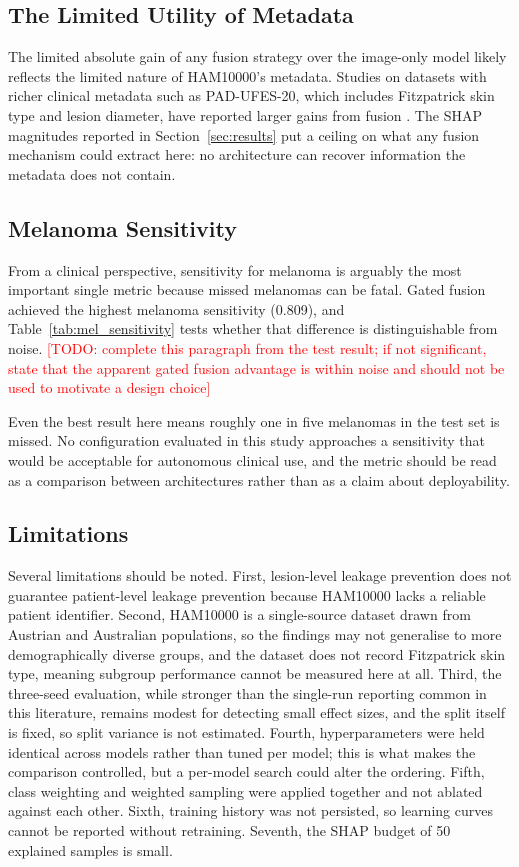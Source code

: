 \documentclass[conference]{IEEEtran}
\newcommand{\TODO}[1]{\textcolor{red}{[TODO: #1]}}
\begin{document}
\subsection{The Limited Utility of Metadata}

The limited absolute gain of any fusion strategy over the image-only model likely reflects the limited nature of HAM10000's metadata. Studies on datasets with richer clinical metadata such as PAD-UFES-20, which includes Fitzpatrick skin type and lesion diameter, have reported larger gains from fusion \citep{pacheco2021attention, mridha2026crossattention}. The SHAP magnitudes reported in Section~\ref{sec:results} put a ceiling on what any fusion mechanism could extract here: no architecture can recover information the metadata does not contain.

\subsection{Melanoma Sensitivity}

From a clinical perspective, sensitivity for melanoma is arguably the most important single metric because missed melanomas can be fatal. Gated fusion achieved the highest melanoma sensitivity (0.809), and Table~\ref{tab:mel_sensitivity} tests whether that difference is distinguishable from noise. \TODO{complete this paragraph from the test result; if not significant, state that the apparent gated fusion advantage is within noise and should not be used to motivate a design choice}

Even the best result here means roughly one in five melanomas in the test set is missed. No configuration evaluated in this study approaches a sensitivity that would be acceptable for autonomous clinical use, and the metric should be read as a comparison between architectures rather than as a claim about deployability.

\subsection{Limitations}

Several limitations should be noted. First, lesion-level leakage prevention does not guarantee patient-level leakage prevention because HAM10000 lacks a reliable patient identifier. Second, HAM10000 is a single-source dataset drawn from Austrian and Australian populations, so the findings may not generalise to more demographically diverse groups, and the dataset does not record Fitzpatrick skin type, meaning subgroup performance cannot be measured here at all. Third, the three-seed evaluation, while stronger than the single-run reporting common in this literature, remains modest for detecting small effect sizes, and the split itself is fixed, so split variance is not estimated. Fourth, hyperparameters were held identical across models rather than tuned per model; this is what makes the comparison controlled, but a per-model search could alter the ordering. Fifth, class weighting and weighted sampling were applied together and not ablated against each other. Sixth, training history was not persisted, so learning curves cannot be reported without retraining. Seventh, the SHAP budget of 50 explained samples is small.
\end{document}

